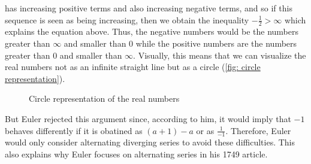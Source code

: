 has increasing positive terms and also increasing negative terms, and so if this sequence is seen as being increasing, then we obtain the inequality $-\frac{1}{2} > \infty$ which explains the equation above. Thus, the negative numbers would be the numbers greater than $\infty$ and smaller than $0$ while the positive numbers are the numbers greater than 0 and smaller than $\infty$. Visually, this means that we can visualize the real numbers not as an infinite straight line but as a circle (\autoref{fig: circle representation}).
\begin{figure}[h!]
\centering
{}
\caption{Circle representation of the real numbers}
\label{fig: circle representation}
\end{figure}
But Euler rejected this argument since, according to him, it would imply that $-1$ behaves differently if it is obatined as $(a+1) - a$ or as $\frac{1}{-1}$. Therefore, Euler would only consider alternating diverging series to avoid these difficulties. This also explains why Euler focuses on alternating series in his 1749 article.

